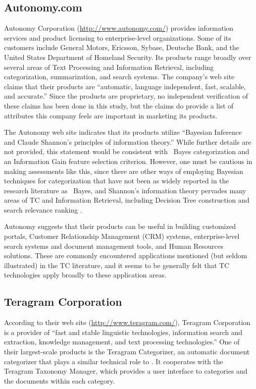 \subsection{Autonomy.com}

Autonomy Corporation (\url{http://www.autonomy.com/}) provides
information services and product licensing to enterprise-level
organizations.  Some of its customers include General Motors,
Ericsson, Sybase, Deutsche Bank, and the United States Department of
Homeland Security.  Its products range broadly over several areas of
Text Processing and Information Retrieval, including categorization,
summarization, and search systems.  The company's web site claims that
their products are ``automatic, language independent, fast, scalable,
and accurate.''  Since the products are proprietary, no independent
verification of these claims has been done in this study, but the
claims do provide a list of attributes this company feels are
important in marketing its products.

The Autonomy web site indicates that its products utilize ``Bayesian
Inference and Claude Shannon's principles of information theory.''
While further details are not provided, this statement would be
consistent with \naive\ Bayes categorization and an Information Gain
feature selection criterion.  However, one must be cautious in making
assessments like this, since there are other ways of employing
Bayesian techniques for categorization that have not been as widely
reported in the research literature as \naive\ Bayes, and Shannon's
information theory pervades many areas of TC and Information
Retrieval, including Decision Tree construction
\cite{quinlan:89,wallace:93} and search relevance ranking
\cite{greiff:00}.

Autonomy suggests that their products can be useful in building
customized portals, Customer Relationship Management (CRM) systems,
enterprise-level search systems and document management tools, and
Human Resources solutions.  These are commonly encountered
applications mentioned (but seldom illustrated) in the TC literature,
and it seems to be generally felt that TC technologies apply broadly
to these application areas.

\subsection{Teragram Corporation}

According to their web site (\url{http://www.teragram.com/}), Teragram
Corporation is a provider of ``fast and stable linguistic
technologies, information search and extraction, knowledge management,
and text processing technologies.''  One of their largest-scale
products is the Teragram Categorizer, an automatic document
categorizer that plays a similar technical role to \aicat.
It cooperates with the Teragram Taxonomy Manager, which provides a
user interface to categories and the documents within each category.

